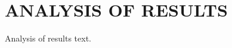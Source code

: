 \section{\uppercase{Analysis of Results}}\label{sec:results-analysis}

\noindent Analysis of results text.
